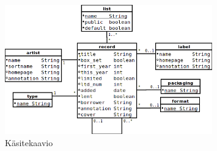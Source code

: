 \documentclass[a4paper,12pt]{report}
\begin{document}
\begin{figure}[H]
  \begin{center}
    \includegraphics[width=0.8\textwidth]{diagrams/kasitekaavio}
  \end{center}
  \caption{Käsitekaavio}
\end{figure}
\end{document}
